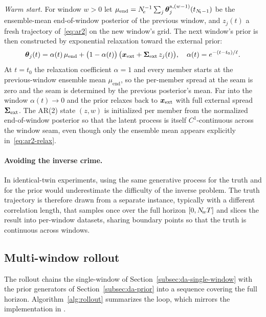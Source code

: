 \medskip
\noindent\emph{Warm start.}\;
For window $w > 0$ let $\mu_{\mathrm{end}} = N_{\!e}^{-1}
\sum_j \boldsymbol{\theta}_j^{\mathrm{a},(w-1)}(t_{N_{\!t}-1})$ be the ensemble-mean
end-of-window posterior of the previous window, and $z_j(t)$ a fresh
trajectory of~\eqref{eq:ar2} on the new window's grid.  The next
window's prior is then constructed by exponential relaxation toward
the external prior:
\begin{equation}
  \boldsymbol{\theta}_j(t) = \alpha(t)\, \mu_{\mathrm{end}}
              + \bigl(1 - \alpha(t)\bigr)\,\bigl(\boldsymbol{x}_{\mathrm{ext}} + \boldsymbol{\Sigma}_{\mathrm{ext}}\, z_j(t)\bigr),
  \quad
  \alpha(t) = e^{-(t - t_0)/\ell}.
  \label{eq:ar2-relax}
\end{equation}
At $t = t_0$ the relaxation coefficient $\alpha = 1$ and every
member starts at the previous-window ensemble mean
$\mu_{\mathrm{end}}$, so the per-member spread at the seam is zero
and the seam is determined by the previous posterior's mean.  Far
into the window $\alpha(t) \to 0$ and the prior relaxes back to
$\boldsymbol{x}_{\mathrm{ext}}$ with full external spread $\boldsymbol{\Sigma}_{\mathrm{ext}}$.  The AR(2) state $(z, w)$
is initialized per member from the normalized end-of-window
posterior so that the latent process is itself $C^1$-continuous
across the window seam, even though only the ensemble mean appears
explicitly in~\eqref{eq:ar2-relax}.

\paragraph{Avoiding the inverse crime.}
In identical-twin experiments, using the same generative process for
the truth and for the prior would underestimate the difficulty of the
inverse problem.  The truth trajectory is therefore drawn from a
separate \paramTSclass{} instance, typically with a
different correlation length, that samples once over the full
horizon $[0, N_{\!w}T]$ and slices the result into per-window
datasets, sharing boundary points so that the truth is continuous
across windows.

\subsection{Multi-window rollout}
\label{subsec:da-multiwindow}

The rollout chains the single-window \ESMDA{} of
Section~\ref{subsec:da-single-window} with the prior generators of
Section~\ref{subsec:da-prior} into a sequence covering the full
horizon.  Algorithm~\ref{alg:rollout} summarizes the loop, which
mirrors the implementation in
\rolloutscript{}.


